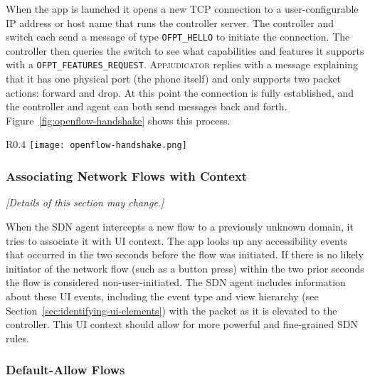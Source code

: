 When the app is launched it opens a new TCP connection to a user-configurable IP
address or host name that runs the controller server. The controller and switch
each send a message of type \texttt{OFPT\_HELLO} to initiate the connection. The
controller then queries the switch to see what capabilities and features it
supports with a \texttt{OFPT\_FEATURES\_REQUEST}.  \textsc{Appjudicator} replies
with a message explaining that it has one physical port (the phone itself) and
only supports two packet actions: forward and drop.  At this point the
connection is fully established, and the controller and agent can both send
messages back and forth. Figure~\ref{fig:openflow-handshake} shows this process.


\begin{wrapfigure}{R}{0.4\textwidth}
	\centering
	\texttt{[image: openflow-handshake.png]}
    \caption{OpenFlow handshake diagram.}
    \label{fig:openflow-handshake}
\end{wrapfigure}


\subsubsection{Associating Network Flows with Context}
\label{sec:associating-network-flows-with-context}

\textit{[Details of this section may change.]}

When the SDN agent intercepts a new flow to a previously unknown domain, it
tries to associate it with UI context. The app looks up any accessibility events
that occurred in the two seconds before the flow was initiated. If there is no
likely initiator of the network flow (such as a button press) within the two
prior seconds the flow is considered non-user-initiated. The SDN agent includes
information about these UI events, including the event type and view hierarchy
(see Section~\ref{sec:identifying-ui-elements}) with the packet as it is
elevated to the controller. This UI context should allow for more powerful and
fine-grained SDN rules.


\subsubsection{Default-Allow Flows}
\label{sec:default-allow-flows}

